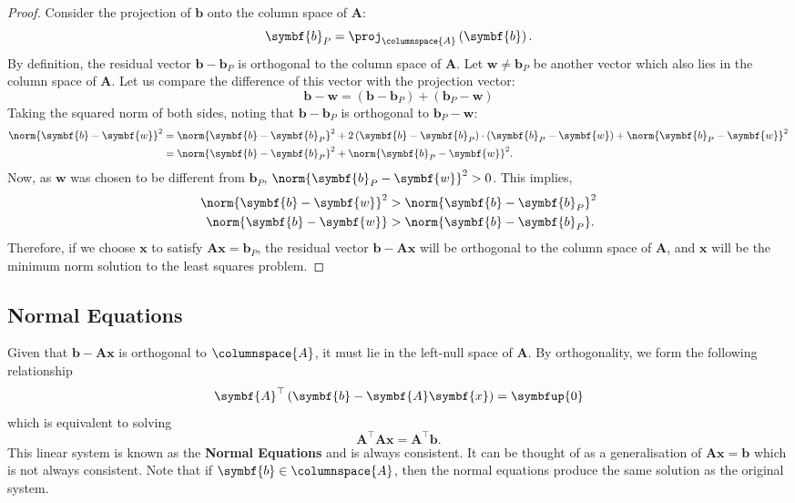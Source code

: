 \documentclass{article}
\begin{document}
\begin{proof}
    Consider the projection of \(\symbf{b}\) onto the column space of
    \(\symbf{A}\):
    \begin{equation*}
        \symbf{b}_P = \proj_{\columnspace{A}} \left( \symbf{b} \right).
    \end{equation*}
    By definition, the residual vector \(\symbf{b} - \symbf{b}_P\)
    is orthogonal to the column space of \(\symbf{A}\). Let
    \(\symbf{w} \neq \symbf{b}_P\) be another vector which also lies in
    the column space of \(\symbf{A}\). Let us compare the difference of
    this vector with the projection vector:
    \begin{equation*}
        \symbf{b} - \symbf{w} = \left( \symbf{b} - \symbf{b}_P \right) + \left( \symbf{b}_P - \symbf{w} \right)
    \end{equation*}
    Taking the squared norm of both sides, noting that
    \(\symbf{b} - \symbf{b}_P\) is orthogonal to \(\symbf{b}_P - \symbf{w}\):
    \begin{align*}
        \norm{\symbf{b} - \symbf{w}}^2 & = \norm{\symbf{b} - \symbf{b}_P}^2 + 2 \left( \symbf{b} - \symbf{b}_P \right) \cdot \left( \symbf{b}_P - \symbf{w} \right) + \norm{\symbf{b}_P - \symbf{w}}^2 \\
                                       & = \norm{\symbf{b} - \symbf{b}_P}^2 + \norm{\symbf{b}_P - \symbf{w}}^2.
    \end{align*}
    Now, as \(\symbf{w}\) was chosen to be different from
    \(\symbf{b}_P\), \(\norm{\symbf{b}_P - \symbf{w}}^2 > 0\). This
    implies,
    \begin{align*}
        \norm{\symbf{b} - \symbf{w}}^2 & > \norm{\symbf{b} - \symbf{b}_P}^2 \\
        \norm{\symbf{b} - \symbf{w}} & > \norm{\symbf{b} - \symbf{b}_P}.
    \end{align*}
    Therefore, if we choose \(\symbf{x}\) to satisfy
    \(\symbf{A} \symbf{x} = \symbf{b}_P\), the residual vector
    \(\symbf{b} - \symbf{A}\symbf{x}\) will be orthogonal to the column
    space of \(\symbf{A}\), and \(\symbf{x}\) will be the minimum norm
    solution to the least squares problem.
\end{proof}
\subsection{Normal Equations}
Given that \(\symbf{b} - \symbf{A}\symbf{x}\) is orthogonal to
\(\columnspace{A}\), it must lie in the left-null space of
\(\symbf{A}\). By orthogonality, we form the following relationship
\begin{equation*}
    \symbf{A}^\top \left( \symbf{b} - \symbf{A}\symbf{x} \right) = \symbfup{0}
\end{equation*}
which is equivalent to solving
\begin{equation*}
    \symbf{A}^\top \symbf{A}\symbf{x} = \symbf{A}^\top \symbf{b}.
\end{equation*}
This linear system is known as the \textbf{Normal Equations} and is
always consistent. It can be thought of as a generalisation of
\(\symbf{A}\symbf{x} = \symbf{b}\) which is not always consistent. Note
that if \(\symbf{b} \in \columnspace{A}\), then the normal equations
produce the same solution as the original system.
\end{document}
